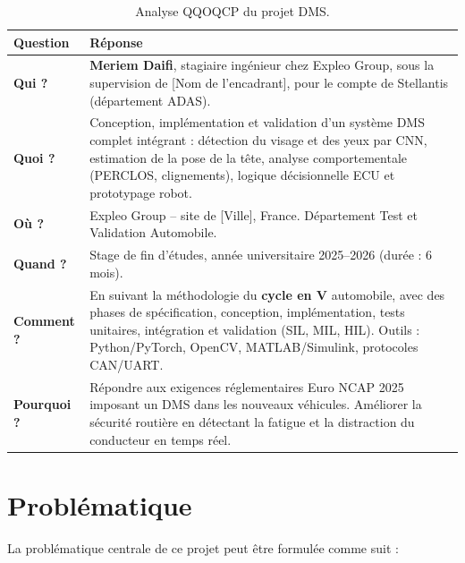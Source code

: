 \begin{table}[H]
\centering
\caption{Analyse QQOQCP du projet DMS.}
\label{tab:qqoqcp}
\renewcommand{\arraystretch}{1.5}
\begin{tabularx}{\textwidth}{|>{\bfseries\centering\arraybackslash}p{2.5cm}|X|}
\hline
\rowcolor{stellantisblue!15}
\textbf{Question} & \textbf{Réponse} \\
\hline
Qui ? & \textbf{Meriem Daifi}, stagiaire ingénieur chez Expleo Group, sous la supervision de [Nom de l'encadrant], pour le compte de Stellantis (département ADAS). \\
\hline
Quoi ? & Conception, implémentation et validation d'un système DMS complet intégrant : détection du visage et des yeux par CNN, estimation de la pose de la tête, analyse comportementale (PERCLOS, clignements), logique décisionnelle ECU et prototypage robot. \\
\hline
Où ? & Expleo Group -- site de [Ville], France. Département Test et Validation Automobile. \\
\hline
Quand ? & Stage de fin d'études, année universitaire 2025--2026 (durée : 6 mois). \\
\hline
Comment ? & En suivant la méthodologie du \textbf{cycle en V} automobile, avec des phases de spécification, conception, implémentation, tests unitaires, intégration et validation (SIL, MIL, HIL). Outils : Python/PyTorch, OpenCV, MATLAB/Simulink, protocoles CAN/UART. \\
\hline
Pourquoi ? & Répondre aux exigences réglementaires Euro NCAP 2025 imposant un DMS dans les nouveaux véhicules. Améliorer la sécurité routière en détectant la fatigue et la distraction du conducteur en temps réel. \\
\hline
\end{tabularx}
\end{table}

\section{Problématique}

La problématique centrale de ce projet peut être formulée comme suit :

\begin{center}
\end{center}

